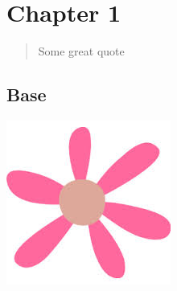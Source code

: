 \documentclass[../book/latex-book.tex]{subfiles}
\begin{document}
\chapter{Chapter 1}
\begin{quote}
Some great quote
\end{quote}
\section{Base}

\begin{center}
  \includegraphics{images/flower1.jpeg}
\end{center}
\end{document}
